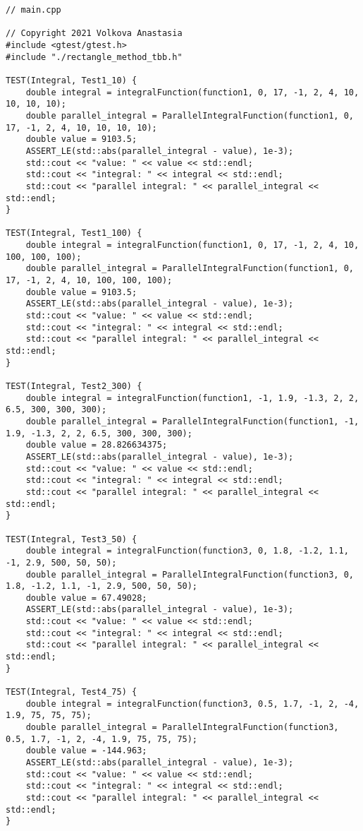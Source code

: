 \documentclass{report}
\begin{document}
\begin{lstlisting}
// main.cpp

// Copyright 2021 Volkova Anastasia
#include <gtest/gtest.h>
#include "./rectangle_method_tbb.h"

TEST(Integral, Test1_10) {
    double integral = integralFunction(function1, 0, 17, -1, 2, 4, 10, 10, 10, 10);
    double parallel_integral = ParallelIntegralFunction(function1, 0, 17, -1, 2, 4, 10, 10, 10, 10);
    double value = 9103.5;
    ASSERT_LE(std::abs(parallel_integral - value), 1e-3);
    std::cout << "value: " << value << std::endl;
    std::cout << "integral: " << integral << std::endl;
    std::cout << "parallel integral: " << parallel_integral << std::endl;
}

TEST(Integral, Test1_100) {
    double integral = integralFunction(function1, 0, 17, -1, 2, 4, 10, 100, 100, 100);
    double parallel_integral = ParallelIntegralFunction(function1, 0, 17, -1, 2, 4, 10, 100, 100, 100);
    double value = 9103.5;
    ASSERT_LE(std::abs(parallel_integral - value), 1e-3);
    std::cout << "value: " << value << std::endl;
    std::cout << "integral: " << integral << std::endl;
    std::cout << "parallel integral: " << parallel_integral << std::endl;
}

TEST(Integral, Test2_300) {
    double integral = integralFunction(function1, -1, 1.9, -1.3, 2, 2, 6.5, 300, 300, 300);
    double parallel_integral = ParallelIntegralFunction(function1, -1, 1.9, -1.3, 2, 2, 6.5, 300, 300, 300);
    double value = 28.826634375;
    ASSERT_LE(std::abs(parallel_integral - value), 1e-3);
    std::cout << "value: " << value << std::endl;
    std::cout << "integral: " << integral << std::endl;
    std::cout << "parallel integral: " << parallel_integral << std::endl;
}

TEST(Integral, Test3_50) {
    double integral = integralFunction(function3, 0, 1.8, -1.2, 1.1, -1, 2.9, 500, 50, 50);
    double parallel_integral = ParallelIntegralFunction(function3, 0, 1.8, -1.2, 1.1, -1, 2.9, 500, 50, 50);
    double value = 67.49028;
    ASSERT_LE(std::abs(parallel_integral - value), 1e-3);
    std::cout << "value: " << value << std::endl;
    std::cout << "integral: " << integral << std::endl;
    std::cout << "parallel integral: " << parallel_integral << std::endl;
}

TEST(Integral, Test4_75) {
    double integral = integralFunction(function3, 0.5, 1.7, -1, 2, -4, 1.9, 75, 75, 75);
    double parallel_integral = ParallelIntegralFunction(function3, 0.5, 1.7, -1, 2, -4, 1.9, 75, 75, 75);
    double value = -144.963;
    ASSERT_LE(std::abs(parallel_integral - value), 1e-3);
    std::cout << "value: " << value << std::endl;
    std::cout << "integral: " << integral << std::endl;
    std::cout << "parallel integral: " << parallel_integral << std::endl;
}


\end{lstlisting}
\end{document}
